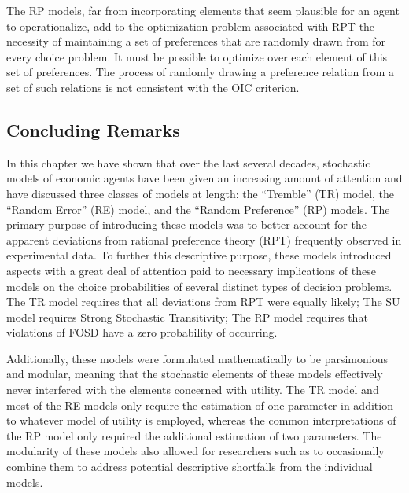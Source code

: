 \documentclass[11pt,a4paper]{article}
\begin{document}
The RP models, far from incorporating elements that seem plausible for an agent to operationalize, add to the optimization problem associated with RPT the necessity of maintaining a set of preferences that are randomly drawn from for every choice problem.
It must be possible to optimize over each element of this set of preferences.
The process of randomly drawing a preference relation from a set of such relations is not consistent with the OIC criterion.

\subsection{Concluding Remarks}

In this chapter we have shown that over the last several decades, stochastic models of economic agents have been given an increasing amount of attention and have discussed three classes of models at length: the \enquote{Tremble} (TR) model, the \enquote{Random Error} (RE) model, and the \enquote{Random Preference} (RP) models.
The primary purpose of introducing these models was to better account for the apparent deviations from rational preference theory (RPT) frequently observed in experimental data.
To further this descriptive purpose, these models introduced aspects with a great deal of attention paid to necessary implications of these models on the choice probabilities of several distinct types of decision problems.
The TR model requires that all deviations from RPT were equally likely;
The SU model requires Strong Stochastic Transitivity;
The RP model requires that violations of FOSD have a zero probability of occurring.

Additionally, these models were formulated mathematically to be parsimonious and modular, meaning that the stochastic elements of these models effectively never interfered with the elements concerned with utility.
The TR model and most of the RE models only require the estimation of one parameter in addition to whatever model of utility is employed, whereas the common interpretations of the RP model only required the additional estimation of two parameters.
The modularity of these models also allowed for researchers such as \textcite{Loomes2002} to occasionally combine them to address potential descriptive shortfalls from the individual models.
\end{document}
